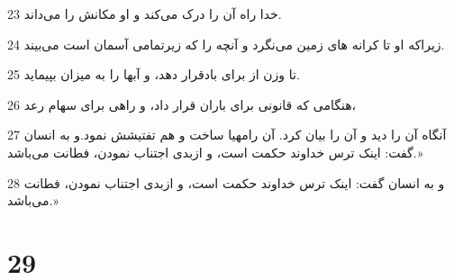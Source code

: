 \par 23 خدا راه آن را درک می‌کند و او مکانش را می‌داند.
\par 24 زیراکه او تا کرانه های زمین می‌نگرد و آنچه را که زیرتمامی آسمان است می‌بیند.
\par 25 تا وزن از برای بادقرار دهد، و آبها را به میزان بپیماید.
\par 26 هنگامی که قانونی برای باران قرار داد، و راهی برای سهام رعد،
\par 27 آنگاه آن را دید و آن را بیان کرد. آن رامهیا ساخت و هم تفتیشش نمود.و به انسان گفت: اینک ترس خداوند حکمت است، و ازبدی اجتناب نمودن، فطانت می‌باشد.»
\par 28 و به انسان گفت: اینک ترس خداوند حکمت است، و ازبدی اجتناب نمودن، فطانت می‌باشد.»
 
\chapter{29}

